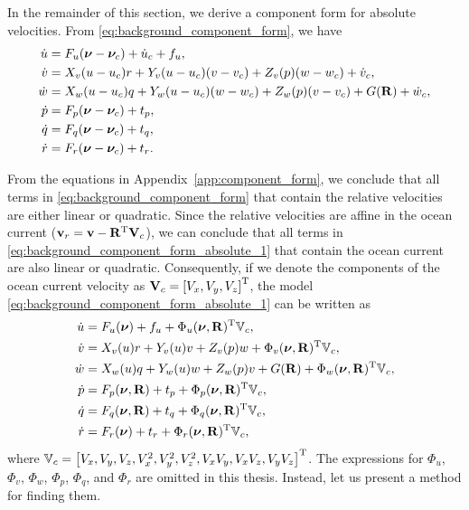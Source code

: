 In the remainder of this section, we derive a component form for absolute velocities.
From \eqref{eq:background_component_form}, we have
\begin{subequations}
    \begin{align}
        \dot{u} &= F_u(\bm{\nu} - \bm{\nu}_c) + \dot{u}_c + f_u, \\
        \dot{v} &= X_v(u - u_c)r + Y_v(u - u_c)(v - v_c) + Z_v(p)(w - w_c) + \dot{v}_c, \\
        \dot{w} &= X_w(u - u_c)q + Y_w(u - u_c)(w - w_c) + Z_w(p)(v - v_c) + G(\mathbf{R}) + \dot{w}_c, \\
        \dot{p} &= F_p(\bm{\nu} - \bm{\nu}_c) + t_p, \\
        \dot{q} &= F_q(\bm{\nu} - \bm{\nu}_c) + t_q, \\
        \dot{r} &= F_r(\bm{\nu} - \bm{\nu}_c) + t_r.
    \end{align}
    \label{eq:background_component_form_absolute_1}
\end{subequations}%

From the equations in Appendix~\ref{app:component_form}, we conclude that all terms in \eqref{eq:background_component_form} that contain the relative velocities are either linear or quadratic.
Since the relative velocities are affine in the ocean current ($\mathbf{v}_r = \mathbf{v} - \mathbf{R}^{\mathrm{T}}\mathbf{V}_c$), we can conclude that all terms in \eqref{eq:background_component_form_absolute_1} that contain the ocean current are also linear or quadratic. 
Consequently, if we denote the components of the ocean current velocity as $\mathbf{V}_c = \left[V_x, V_y, V_z\right]^{\mathrm{T}}$, the model \eqref{eq:background_component_form_absolute_1} can be written as
\begin{subequations}
    \begin{align}
        \dot{u} &= F_u(\bm{\nu}) + f_u + \Phi_u(\bm{\nu}, \mathbf{R})^{\mathrm{T}}\mathbb{V}_c, \\
        \dot{v} &= X_v(u)r + Y_v(u)v + Z_v(p)w + \Phi_v(\bm{\nu}, \mathbf{R})^{\mathrm{T}}\mathbb{V}_c, \\
        \dot{w} &= X_w(u)q + Y_w(u)w + Z_w(p)v + G(\mathbf{R}) + \Phi_w(\bm{\nu}, \mathbf{R})^{\mathrm{T}}\mathbb{V}_c, \\
        \dot{p} &= F_p(\bm{\nu}, \mathbf{R}) + t_p + \Phi_p(\bm{\nu}, \mathbf{R})^{\mathrm{T}}\mathbb{V}_c, \\
        \dot{q} &= F_q(\bm{\nu}, \mathbf{R}) + t_q + \Phi_q(\bm{\nu}, \mathbf{R})^{\mathrm{T}}\mathbb{V}_c, \\
        \dot{r} &= F_r(\bm{\nu}) + t_r + \Phi_r(\bm{\nu}, \mathbf{R})^{\mathrm{T}}\mathbb{V}_c,
    \end{align}
    \label{eq:background_component_form_absolute_2}
\end{subequations}
where $\mathbb{V}_c = \left[V_x, V_y, V_z, V_x^2, V_y^2, V_z^2, V_xV_y, V_xV_z, V_yV_z\right]^{\mathrm{T}}$.
The expressions for $\Phi_u$, $\Phi_v$, $\Phi_w$, $\Phi_p$, $\Phi_q$, and $\Phi_r$ are omitted in this thesis.
Instead, let us present a method for finding them.

